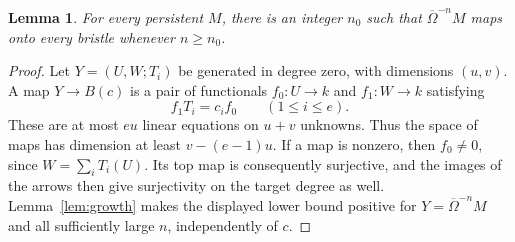 \documentclass[11pt]{article}
\newtheorem{lemma}[theorem]{Lemma}
\theoremstyle{definition}\newtheorem{definition}[theorem]{Definition}
\theoremstyle{remark}\newtheorem{remark}[theorem]{Remark}
\newcommand{\Om}{\overline\Omega}
\begin{document}
\begin{lemma}\label{lem:bristlequotient}
For every persistent $M$, there is an integer $n_0$ such that $\Om^{-n}M$ maps onto every bristle whenever $n\ge n_0$.
\end{lemma}
\begin{proof}
Let $Y=(U,W;T_i)$ be generated in degree zero, with dimensions $(u,v)$. A map $Y\to B(c)$ is a pair of functionals $f_0:U\to k$ and $f_1:W\to k$ satisfying
\[
 f_1T_i=c_i f_0\qquad(1\le i\le e).
\]
These are at most $eu$ linear equations on $u+v$ unknowns. Thus the space of maps has dimension at least $v-(e-1)u$. If a map is nonzero, then $f_0\ne0$, since $W=\sum_iT_i(U)$. Its top map is consequently surjective, and the images of the arrows then give surjectivity on the target degree as well. Lemma~\ref{lem:growth} makes the displayed lower bound positive for $Y=\Om^{-n}M$ and all sufficiently large $n$, independently of $c$.
\end{proof}
\end{document}
